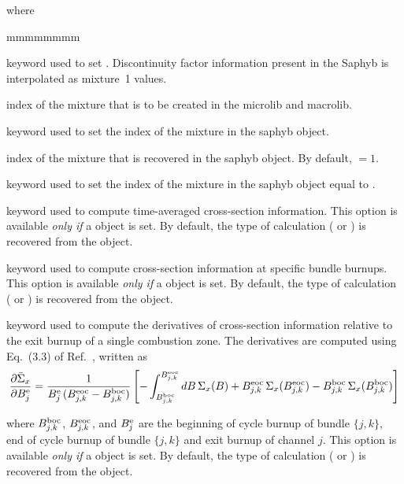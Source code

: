 \noindent where
\begin{ListeDeDescription}{mmmmmmmm}

\item[\moc{MIX}] keyword used to set . Discontinuity factor information present in the Saphyb is interpolated as mixture~1 values.

\item[\dusa{imix}] index of the mixture that is to be created in the {\sc microlib} and {\sc macrolib}.

\item[\moc{FROM}] keyword used to set the index of the mixture in the {\sc saphyb} object.

\item[\dusa{imixold}] index of the mixture that is recovered in the {\sc saphyb} object. By default, $=1$.

\item[\moc{USE}] keyword used to set the index of the mixture in the {\sc saphyb} object equal to .

\item[\moc{TIMAV-BURN}] keyword used to compute time-averaged cross-section information. This option is available {\sl only if} a  object is set.
By default, the type of calculation ( or ) is recovered from the  object.

\item[\moc{INST-BURN}] keyword used to compute cross-section information at specific bundle burnups. This option is available {\sl only if} a  object is set.
By default, the type of calculation ( or ) is recovered from the  object.

\item[\moc{AVG-EX-BURN}] keyword used to compute the derivatives of cross-section information relative to the exit burnup of a single combustion zone. The derivatives are computed using Eq.~(3.3) of Ref.~, written as
$$
{\partial \bar\Sigma_x\over \partial B_j^{\rm e}}={1\over B_j^{\rm e}\, (B_{j,k}^{\rm eoc}-B_{j,k}^{\rm boc})}
\left[- \int_{B_{j,k}^{\rm boc}}^{B_{j,k}^{\rm eoc}}dB \, \Sigma_x(B)+B_{j,k}^{\rm eoc}\, \Sigma_x(B_{j,k}^{\rm eoc})-B_{j,k}^{\rm boc}\, \Sigma_x(B_{j,k}^{\rm boc})\right]
$$

\noindent where $B_{j,k}^{\rm boc}$, $B_{j,k}^{\rm eoc}$, and $B_j^{\rm e}$ are the beginning of cycle burnup of bundle $\{j,k\}$, end of cycle burnup of bundle $\{j,k\}$ and exit burnup of channel $j$. This option is available {\sl only if} a  object is set.
By default, the type of calculation ( or ) is recovered from the  object.


\end{ListeDeDescription}
